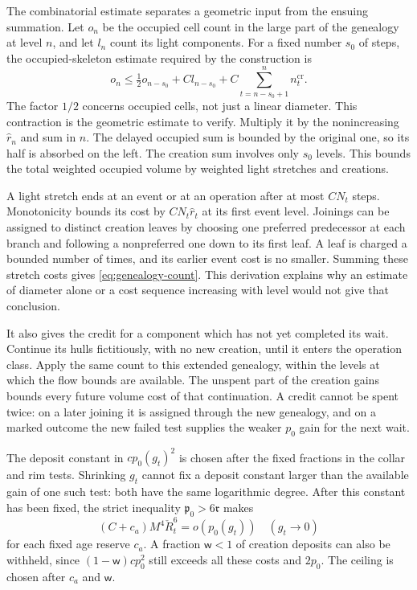 \documentclass[11pt,letterpaper,reqno]{amsart}
\theoremstyle{definition}
\theoremstyle{remark}
\begin{document}
The combinatorial estimate separates a geometric input
from the ensuing summation. Let $o_n$ be the occupied
cell count in the large part of the genealogy at level
$n$, and let $l_n$ count its light components. For a
fixed number $s_0$ of steps, the occupied-skeleton
estimate required by the construction is
\[
 o_n\le\tfrac12o_{n-s_0}+Cl_{n-s_0}
                     +C\sum_{t=n-s_0+1}^nn_t^{\mathrm{cr}}.
\]
The factor $1/2$ concerns occupied cells, not just a
linear diameter. This contraction is the geometric estimate
to verify. Multiply it by
the nonincreasing $\widehat r_n$ and sum in $n$.
The delayed occupied sum is bounded by the original
one, so its half is absorbed on the left. The creation
sum involves only $s_0$ levels. This bounds the total
weighted occupied volume by weighted light stretches
and creations.

A light stretch ends at an event or at an operation
after at most $CN_t$ steps. Monotonicity bounds its
cost by $CN_t\widehat r_t$ at its first event level.
Joinings can be assigned to distinct creation leaves
by choosing one preferred predecessor at each branch
and following a nonpreferred one down to its first
leaf. A leaf is charged a bounded number of times,
and its earlier event cost is no smaller. Summing
these stretch costs gives \eqref{eq:genealogy-count}.
This derivation explains why an estimate of diameter
alone or a cost sequence increasing with level would
not give that conclusion.

It also gives the credit for a component which has
not yet completed its wait. Continue its hulls
fictitiously, with no new creation, until it enters
the operation class. Apply the same count to this
extended genealogy, within the levels at which the
flow bounds are available. The unspent part of the
creation gains bounds every future volume cost of
that continuation. A credit cannot be spent twice:
on a later joining it is assigned through the new
genealogy, and on a marked outcome the new failed
test supplies the weaker $p_0$ gain for the next wait.

The deposit constant in $cp_0(g_t)^2$ is chosen after
the fixed fractions in the collar and rim tests.
Shrinking $g_t$ cannot fix a deposit constant larger
than the available gain of one such test: both have
the same logarithmic degree. After this constant
has been fixed, the strict inequality
$\mathfrak p_0>6\mathfrak r$ makes
\[
 (C+c_a)M^4\check R_t^6=o(p_0(g_t))
             \quad(g_t\longrightarrow0)
\]
for each fixed age reserve $c_a$. A fraction
$\mathsf w<1$ of creation deposits can also be
withheld, since $(1-\mathsf w)cp_0^2$ still exceeds
all these costs and $2p_0$. The ceiling is chosen
after $c_a$ and $\mathsf w$.
\end{document}
